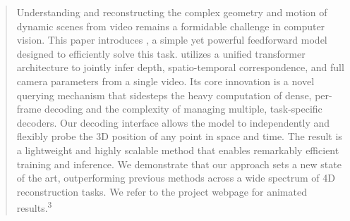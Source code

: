 \begin{abstract}
    Understanding and reconstructing the complex geometry and motion of dynamic scenes from video remains a formidable challenge in computer vision.
    This paper introduces \name, a simple yet powerful feedforward model designed to efficiently solve this task.
    \name utilizes a unified transformer architecture to jointly infer depth, spatio-temporal correspondence, and full camera parameters from a single video.
    Its core innovation is a novel querying mechanism that sidesteps the heavy computation of dense, per-frame decoding and the complexity of managing multiple, task-specific decoders.
    Our decoding interface allows the model to independently and flexibly probe the 3D position of any point in space and time.
    The result is a lightweight and highly scalable method that enables remarkably efficient training and inference.
    We demonstrate that our approach sets a new state of the art, outperforming previous methods across a wide spectrum of 4D reconstruction tasks.
    We refer to the project webpage for animated results.\textsuperscript{3}
\end{abstract}

